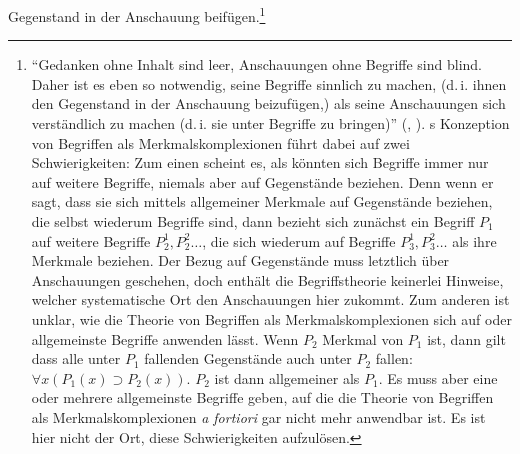 Gegenstand in der Anschauung
beifügen.\footnote{\label{Fussnote:InfiniterRegressBegriffeueberMerkmale}\enquote{Gedanken
    ohne Inhalt sind leer, Anschauungen ohne Begriffe sind
    blind. Daher ist es eben so notwendig, seine Begriffe sinnlich zu
    machen, (d.\,i. ihnen den Gegenstand in der Anschauung
    beizufügen,) als seine Anschauungen sich verständlich zu machen
    (d.\,i. sie unter Begriffe zu bringen)} \mkbibparens{\cite[][B
    75]{Kant:KritikderreinenVernunft2003}, \cite[][III:
    75.14--18]{Kant:GesammelteWerke1900ff.}}. s
  Konzeption von Begriffen als Merkmalskomplexionen führt dabei auf
  zwei Schwierigkeiten: Zum einen scheint es, als könnten sich
  Begriffe immer nur auf weitere Begriffe, niemals aber auf
  Gegenstände beziehen. Denn wenn er sagt, dass sie sich mittels
  allgemeiner Merkmale auf Gegenstände beziehen, die selbst wiederum
  Begriffe sind, dann bezieht sich zunächst ein Begriff $ P_1 $ auf
  weitere Begriffe $ P_2^1 , P_2^2 \dots $, die sich wiederum auf
  Begriffe $P_3^1, P_3^2 \dots$ als ihre Merkmale beziehen. Der Bezug
  auf Gegenstände muss letztlich über Anschauungen geschehen, doch
  enthält die Begriffstheorie keinerlei Hinweise, welcher
  systematische Ort den Anschauungen hier zukommt. Zum anderen ist
  unklar, wie die Theorie von Begriffen als Merkmalskomplexionen sich auf
   oder allgemeinste Begriffe anwenden
  lässt. Wenn $P_2$ Merkmal von $P_1$ ist, dann gilt dass alle unter
  $P_1$ fallenden Gegenstände auch unter $P_2$ fallen: $ \forall x
  (P_1(x) \supset P_2(x)) $. $P_2$ ist dann allgemeiner als $P_1$. Es
  muss aber eine oder mehrere allgemeinste Begriffe geben, auf die die
  Theorie von Begriffen als Merkmalskomplexionen \emph{a fortiori} gar
  nicht mehr anwendbar ist. Es ist hier nicht der Ort, diese
  Schwierigkeiten aufzulösen.}

